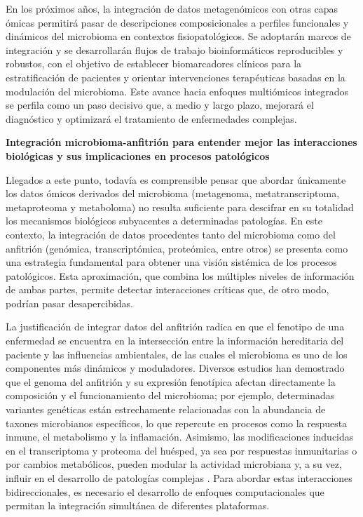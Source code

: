 En los próximos años, la integración de datos metagenómicos con otras capas ómicas permitirá pasar de descripciones composicionales a perfiles funcionales y dinámicos del microbioma en contextos fisiopatológicos. Se adoptarán marcos de integración y se desarrollarán flujos de trabajo bioinformáticos reproducibles y robustos, con el objetivo de establecer biomarcadores clínicos para la estratificación de pacientes y orientar intervenciones terapéuticas basadas en la modulación del microbioma. Este avance hacia enfoques multiómicos integrados se perfila como un paso decisivo que, a medio y largo plazo, mejorará el diagnóstico y optimizará el tratamiento de enfermedades complejas.
    
    
\textbf{Integración microbioma-anfitrión para entender mejor las interacciones biológicas y sus implicaciones en procesos patológicos}


Llegados a este punto, todavía es comprensible pensar que abordar únicamente los datos ómicos derivados del microbioma (metagenoma, metatranscriptoma, metaproteoma y metaboloma) no resulta suficiente para descifrar en su totalidad los mecanismos biológicos subyacentes a determinadas patologías. En este contexto, la integración de datos procedentes tanto del microbioma como del anfitrión (genómica, transcriptómica, proteómica, entre otros) se presenta como una estrategia fundamental para obtener una visión sistémica de los procesos patológicos. Esta aproximación, que combina los múltiples niveles de información de ambas partes, permite detectar interacciones críticas que, de otro modo, podrían pasar desapercibidas.

La justificación de integrar datos del anfitrión radica en que el fenotipo de una enfermedad se encuentra en la intersección entre la información hereditaria del paciente y las influencias ambientales, de las cuales el microbioma es uno de los componentes más dinámicos y moduladores. Diversos estudios han demostrado que el genoma del anfitrión y su expresión fenotípica afectan directamente la composición y el funcionamiento del microbioma; por ejemplo, determinadas variantes genéticas están estrechamente relacionadas con la abundancia de taxones microbianos específicos, lo que repercute en procesos como la respuesta inmune, el metabolismo y la inflamación. Asimismo, las modificaciones inducidas en el transcriptoma y proteoma del huésped, ya sea por respuestas inmunitarias o por cambios metabólicos, pueden modular la actividad microbiana y, a su vez, influir en el desarrollo de patologías complejas \cite{duan2025advances}. Para abordar estas interacciones bidireccionales, es necesario el desarrollo de enfoques computacionales que permitan la integración simultánea de diferentes plataformas.


